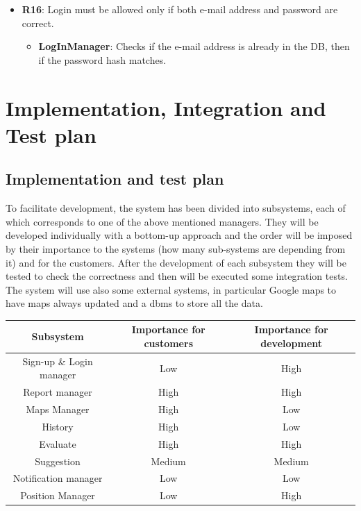 \documentclass[12pt,a4paper]{report}
\begin{document}
\begin{itemize}
	\item\textbf{R16}: Login must be allowed only if both e-mail address and password are correct.
		\begin{itemize}
		\item\textbf{LogInManager}: Checks if the e-mail address is already in the DB, then if the password hash matches.
		\end{itemize}
	\end{itemize}

	\chapter{Implementation, Integration and Test plan}
		\section{Implementation and test plan}
			To facilitate development, the system has been divided into subsystems, each of which corresponds to one of the
			above mentioned managers. They will be developed individually with a bottom-up approach and the order will be
			imposed by their importance to the systems (how many sub-systems are depending from it) and for the customers.
			After the development of each subsystem they will be tested to check the correctness and then will be executed
			some integration tests. The system will use also some external systems, in particular Google maps to have maps
			always updated and a dbms to store all the data.
			\begin{table}[H]
				\centering
				\begin{tabular}{|c|c|c|}
					 \rowcolor{gray!50}
					\hline
					Subsystem & Importance for customers & Importance for development\\
					\hline
					\hline
					Sign-up \& Login manager & Low & High\\
					\hline
					Report manager & High & High\\
					\hline
					Maps Manager & High & Low\\
					\hline
					History & High & Low\\
					\hline
					Evaluate & High & High\\
					\hline
					Suggestion & Medium & Medium\\
					\hline
					Notification manager & Low & Low\\
					\hline
					Position Manager & Low & High\\
					\hline
				\end{tabular}
				\label{tab: }
			\end{table}
\end{document}
